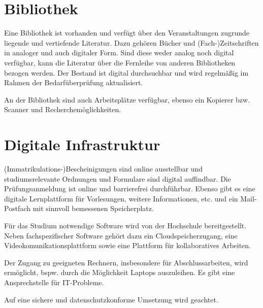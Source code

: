 \section{Bibliothek}

Eine Bibliothek ist vorhanden und verfügt über den Veranstaltungen zugrunde liegende und vertiefende Literatur. Dazu gehören Bücher und (Fach-)Zeitschriften in analoger und auch digitaler Form. Sind diese weder analog noch digital verfügbar, kann die Literatur über die Fernleihe von anderen Bibliotheken bezogen werden. Der Bestand ist digital durchsuchbar und wird regelmäßig im Rahmen der Bedarfüberprüfung aktualisiert.

An der Bibliothek sind auch Arbeitsplätze verfügbar, ebenso ein Kopierer bzw. Scanner und Recherchemöglichkeiten.

\section{Digitale Infrastruktur}

(Immatrikulations-)Bescheinigungen sind online ausstellbar und studiumsrelevante Ordnungen und Formulare sind digital auffindbar. Die Prüfungsanmeldung ist online und barrierefrei durchführbar. Ebenso gibt es eine digitale Lernplattform für Vorlesungen, weitere Informationen, etc. und ein Mail-Postfach mit sinnvoll bemessenen Speicherplatz.

Für das Studium notwendige Software wird von der Hochschule bereitgestellt. Neben fachspezifischer Software gehört dazu ein Cloudspeicherzugang, eine Videokomunikationsplattform sowie eine Plattform für kollaboratives Arbeiten.

Der Zugang zu geeigneten Rechnern, insbesondere für Abschlussarbeiten, wird ermöglicht, bspw. durch die Möglichkeit Laptops auszuleihen. Es gibt eine Ansprechstelle für IT-Probleme.

Auf eine sichere und datenschutzkonforme Umsetzung wird geachtet.
